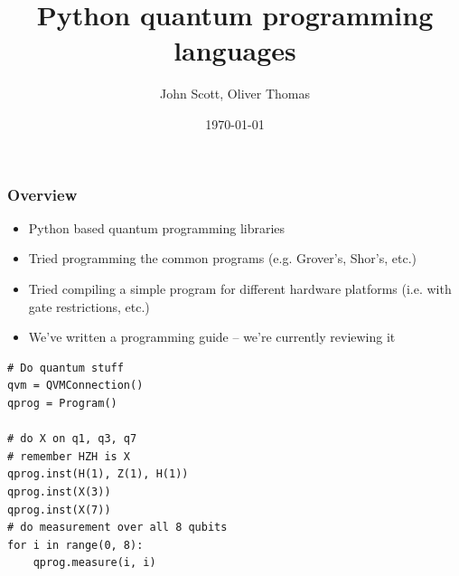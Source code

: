 \documentclass{beamer}
\title{Python quantum programming languages}
\author{John Scott, Oliver Thomas}
\institute{Quantum Engineering CDT \\ University of Bristol}
\date{\today}
\begin{document}
\frame{\titlepage}

\begin{frame}[fragile]
\frametitle{Overview}
\begin{minipage}{0.52\textwidth}
\begin{itemize}
    \item Python based quantum programming libraries
    \item Tried programming the common programs (e.g. Grover's, Shor's, etc.)
    \item Tried compiling a simple program for different hardware platforms (i.e. with gate restrictions, etc.)
    \item We've written a programming guide -- we're currently reviewing it
\end{itemize}
\end{minipage} \hfill
%
\begin{minipage}{0.44\textwidth}
 \begin{verbatim}
# Do quantum stuff  
qvm = QVMConnection() 
qprog = Program() 

# do X on q1, q3, q7 
# remember HZH is X 
qprog.inst(H(1), Z(1), H(1)) 
qprog.inst(X(3)) 
qprog.inst(X(7)) 
# do measurement over all 8 qubits 
for i in range(0, 8): 
    qprog.measure(i, i) 
  \end{verbatim}
  \end{minipage}
\end{frame}
\end{document}
